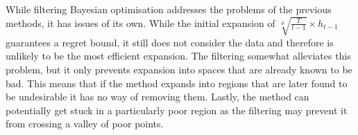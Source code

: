 \documentclass[preprint]{elsarticle}
\begin{document}
While filtering Bayesian optimisation addresses the problems of the previous methods, it has issues of its own. While the initial expansion of $\sqrt[d]{\frac{T}{t-1}}\times h_{t-1}$ guarantees a regret bound, it still does not consider the data and therefore is unlikely to be the most efficient expansion. The filtering somewhat alleviates this problem, but it only prevents expansion into spaces that are already known to be bad. This means that if the method expands into regions that are later found to be undesirable it has no way of removing them. Lastly, the method can potentially get stuck in a particularly poor region as the filtering may prevent it from crossing a valley of poor points.

%
\end{document}
